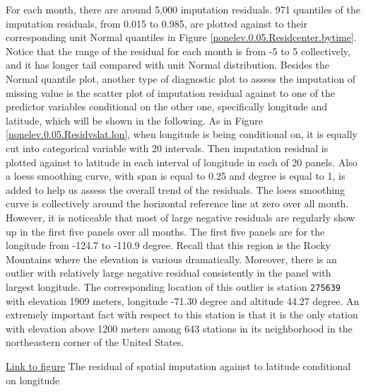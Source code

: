 For each month, there are around 5,000 imputation residuals. 971 quantiles of the
imputation residuals, from 0.015 to 0.985, are plotted against to their corresponding 
unit Normal quantiles in Figure 
\href{../plots/a1950/spaimpute/nonelev/span0.05/a1950.spaResidcenter.bytime.pdf}
{\ref*{nonelev.0.05.Residcenter.bytime}}. Notice that the range of the residual
for each month is from -5 to 5 collectively, and it has longer tail compared with
unit Normal distribution. Besides the Normal quantile plot, another type of 
diagnostic plot to assess the imputation of missing value is the scatter plot of
imputation residual against to one of the predictor variables conditional on the
other one, specifically longitude and latitude, which will be shown in the following. 
As in Figure
\href{../plots/a1950/spaimpute/nonelev/span0.05/a1950.spaResid.vs.lat.lon.pdf}
{\ref*{nonelev.0.05.Residvslat.lon}}, when longitude is being conditional on, it
is equally cut into categorical variable with 20 intervals. Then imputation 
residual is plotted against to latitude in each interval of longitude in each of
20 panels. Also a loess smoothing curve, with span is equal to 0.25 and degree is
equal to 1, is added to help us assess the overall trend of the residuals. The 
loess smoothing curve is collectively around the horizontal reference line at zero
over all month. However, it is noticeable that most of large negative residuals are
regularly show up in the first five panels over all months. The first five panels
are for the longitude from -124.7 to -110.9 degree. Recall that this region is
the Rocky Mountains where the elevation is various dramatically.
Moreover, there is an outlier with relatively large negative residual consistently 
in the panel with largest longitude. The corresponding location of this outlier
is station \texttt{275639} with elevation 1909 meters, longitude -71.30 degree
and altitude 44.27 degree. An extremely important fact with respect to this
station is that it is the only station with elevation above 1200 meters among
643 stations in its neighborhood in the northeastern corner of the United States. 

\begin{framed}
\begin{center}
  \href{../plots/a1950/spaimpute/nonelev/span0.05/a1950.spaResid.vs.lat.lon.pdf}
  {Link to figure}
  {The residual of spatial imputation against to latitude conditional on longitude}
  \label{nonelev.0.05.Residvslat.lon}
\end{center}
\end{framed}

